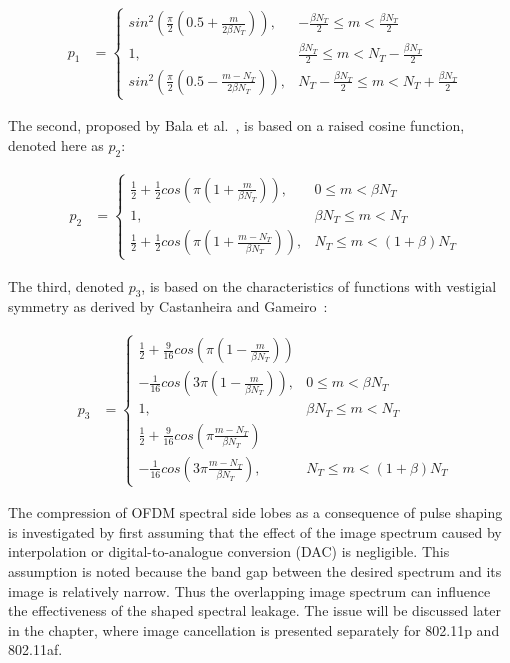 \begin{eqnarray}
\label{p1m}
&p_1 &=\begin{cases}	sin^2( \frac{\pi}{2}(0.5+\frac{m}{2\beta N_{T}}) ), 		& -\frac{\beta N_{T}}{2} \leq m < \frac{\beta N_{T}}{2} \\
					 	1, 															& \frac{\beta N_{T}}{2} \leq m < N_{T} - \frac{\beta N_{T}}{2} \\
					 	sin^2( \frac{\pi}{2}(0.5-\frac{m-N_{T}}{2\beta N_{T}}) ), 	&  N_{T} - \frac{\beta N_{T}}{2} \leq m <  N_{T} + \frac{\beta N_{T}}{2} \end{cases}
\end{eqnarray}

The second, proposed by Bala et al.~\cite{Bala2013}, is based on a raised cosine function, denoted here as $p_2$:

\begin{eqnarray}
\label{p2m}
&p_2 &=\begin{cases}	\frac{1}{2}+\frac{1}{2}cos(\pi(1+\frac{m}{\beta N_{T}})), 			&0\leq m<\beta N_{T} \\
					 	1, 																	&\beta N_{T}\leq m < N_{T}  \\
					 	\frac{1}{2}+\frac{1}{2}cos(\pi(1+\frac{m-N_{T}}{\beta N_{T}})),		& N_{T}\leq m<(1+\beta)N_{T} \end{cases}
\end{eqnarray}

The third, denoted $p_3$, is based on the characteristics of functions with vestigial symmetry as derived by Castanheira and Gameiro~\cite{Castanheira2013}:

\begin{eqnarray}
\label{p3m}
&p_3 &=\begin{cases}	\frac{1}{2}+\frac{9}{16}cos( \pi(1 - \frac{m}{\beta N_{T}}) ) & \\
						- \frac{1}{16}cos(3\pi(1 - \frac{m}{\beta N_{T}}) ), 					& 0 \leq m < \beta N_{T} \\
					 	1, 																	& \beta N_{T} \leq m < N_{T}  \\
					 	\frac{1}{2}+\frac{9}{16}cos( \pi \frac{m-N_{T}}{\beta N_{T}}) &\\
						-\frac{1}{16}cos(3\pi \frac{m-N_{T}}{\beta N_{T}}),					&  N_{T} \leq m < (1+\beta)N_{T} \end{cases}
\end{eqnarray}

The compression of OFDM spectral side lobes as a consequence of pulse shaping is investigated by first assuming that the effect of the image spectrum caused by interpolation or digital-to-analogue conversion (DAC) is negligible.
This assumption is noted because the band gap between the desired spectrum and its image is relatively narrow.
Thus the overlapping image spectrum can influence the effectiveness of the shaped spectral leakage.
The issue will be discussed later in the chapter, where image cancellation is presented separately for 802.11p and 802.11af.

